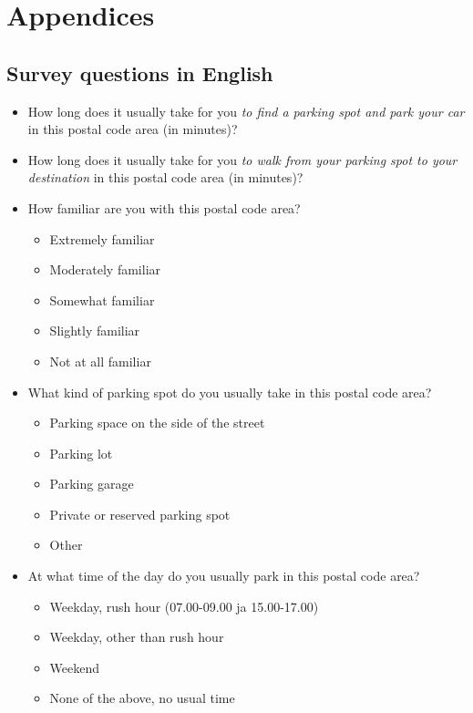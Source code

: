 \section{Appendices}

\subsection{Survey questions in English}
\justify
\begin{spacing}{1}
    \begin{itemize}
        \item How long does it usually take for you \textit{to find a parking spot and park your car} in this postal code area (in minutes)?
        \item How long does it usually take for you \textit{to walk from your parking spot to your destination} in this postal code area (in minutes)?
        \item How familiar are you with this postal code area?
        \begin{itemize}
            \item Extremely familiar
            \item Moderately familiar
            \item Somewhat familiar
            \item Slightly familiar
            \item Not at all familiar
        \end{itemize}
        \item What kind of parking spot do you usually take in this postal code area?
        \begin{itemize}
            \item Parking space on the side of the street
            \item Parking lot
            \item Parking garage
            \item Private or reserved parking spot
            \item Other
        \end{itemize}
        \item At what time of the day do you usually park in this postal code area?
        \begin{itemize}
            \item Weekday, rush hour (07.00-09.00 ja 15.00-17.00)
            \item Weekday, other than rush hour
            \item Weekend
            \item None of the above, no usual time
        \end{itemize}
    \end{itemize}
\end{spacing}

